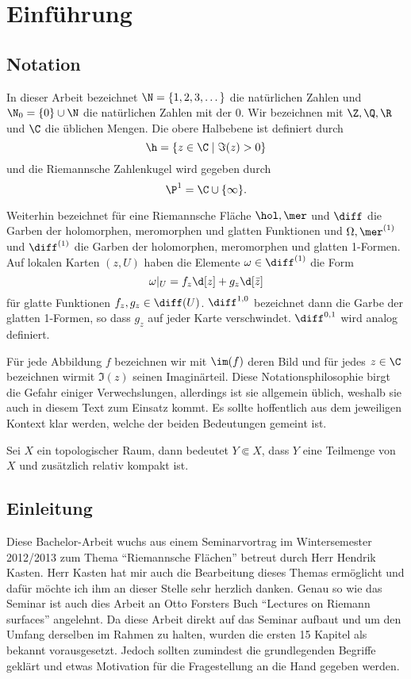 
\section{Einführung}
\label{sec:einführung}

\subsection{Notation}
\label{sec:notation}

In dieser Arbeit bezeichnet $\N = \{1, 2, 3, \dots\}$ die natürlichen
Zahlen und $\N_0 = \{0 \} \cup \N$ die natürlichen Zahlen mit der
0. Wir bezeichnen mit $\Z, \Q, \R$ und $\C$ die üblichen Mengen. Die 
obere Halbebene ist definiert durch
\[
\h = \{ z \in \C \mid \Im(z) > 0 \}
\]
und die Riemannsche Zahlenkugel wird gegeben durch
\[
\P^1 = \C \cup \{\infty\}.
\]

Weiterhin bezeichnet für eine Riemannsche Fläche $\hol, \mer$ und $\diff$
die Garben der holomorphen, meromorphen und glatten Funktionen und
$\Omega, \mer^{(1)}$ und $\diff^{(1)}$ die Garben der holomorphen,
meromorphen und glatten 1-Formen. Auf lokalen Karten $(z,U)$ haben die
Elemente $\omega \in \diff^{(1)}$ die Form
\[
\omega|_U = f_z \d[z] + g_z\d[\bar z]
\]
für glatte Funktionen $f_z,g_z \in \diff(U)$. $\diff^{1,0}$ bezeichnet
dann die Garbe der glatten 1-Formen, so dass $g_z$ auf jeder Karte
verschwindet. $\diff^{0,1}$ wird analog definiert.

Für jede Abbildung $f$ bezeichnen wir mit $\im(f)$ deren Bild und für
jedes $z \in \C$ bezeichnen wirmit $\Im(z)$ seinen Imaginärteil. Diese
Notationsphilosophie birgt die Gefahr einiger Verwechslungen,
allerdings ist sie allgemein üblich, weshalb sie auch in diesem Text
zum Einsatz kommt. Es sollte hoffentlich aus dem jeweiligen Kontext
klar werden, welche der beiden Bedeutungen gemeint ist.

Sei $X$ ein topologischer Raum, dann bedeutet $Y \Subset X$, dass $Y$
eine Teilmenge von $X$ und zusätzlich relativ kompakt ist.

\subsection{Einleitung}
\label{sec:einleitung}

Diese Bachelor-Arbeit wuchs aus einem Seminarvortrag im Wintersemester
2012/2013 zum Thema "`Riemannsche Flächen"' betreut durch Herr Hendrik
Kasten. Herr Kasten hat mir auch die Bearbeitung dieses Themas
ermöglicht und dafür möchte ich ihm an dieser Stelle sehr herzlich
danken. Genau so wie das Seminar ist auch dies Arbeit an Otto Forsters
Buch "`Lectures on Riemann surfaces"' \cite{For} angelehnt. Da diese
Arbeit direkt auf das Seminar aufbaut und um den Umfang derselben im
Rahmen zu halten, wurden die ersten 15 Kapitel
als bekannt vorausgesetzt. Jedoch sollten zumindest die grundlegenden
Begriffe geklärt und etwas Motivation für die Fragestellung an
die Hand gegeben werden.

